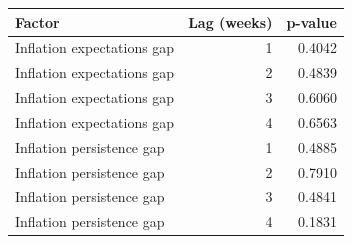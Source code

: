 \begin{tabular}{lrr}
\toprule
Factor & Lag (weeks) & p-value \\
\midrule
Inflation expectations gap & 1 & 0.4042 \\
Inflation expectations gap & 2 & 0.4839 \\
Inflation expectations gap & 3 & 0.6060 \\
Inflation expectations gap & 4 & 0.6563 \\
Inflation persistence gap & 1 & 0.4885 \\
Inflation persistence gap & 2 & 0.7910 \\
Inflation persistence gap & 3 & 0.4841 \\
Inflation persistence gap & 4 & 0.1831 \\
\bottomrule
\end{tabular}

